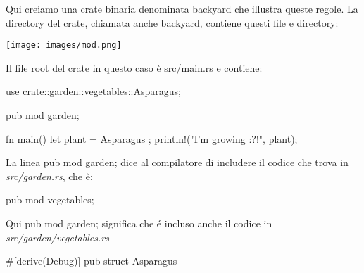 \documentclass[11pt,a4paper]{article}
\begin{document}
Qui creiamo una crate binaria denominata backyard che illustra queste regole. La directory del crate, chiamata anche backyard, contiene questi file e directory:
\begin{center}
\texttt{[image: images/mod.png]}
\end{center}
Il file root del crate in questo caso è src/main.rs e contiene:
\begin{rust}
use crate::garden::vegetables::Asparagus;

pub mod garden;

fn main() {
    let plant = Asparagus {};
    println!("I'm growing {:?}!", plant);
}
\end{rust}
La linea pub mod garden; dice al compilatore di includere il codice che trova in \textit{src/garden.rs}, che è:
\begin{rust}
pub mod vegetables;
\end{rust}
Qui pub mod garden; significa che é incluso anche il codice in \textit{src/garden/vegetables.rs}
\begin{rust}
 #[derive(Debug)]
pub struct Asparagus {}
 \end{rust} 
\end{document}

